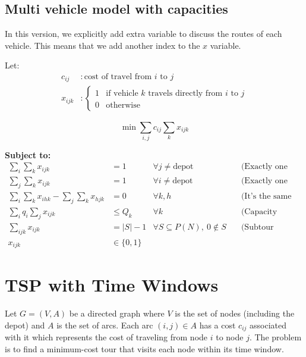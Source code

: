 \subsection{Multi vehicle model with capacities}
In this version, we explicitly add extra variable to discuss the routes of each vehicle.   This means that we add another index to the $x$ variable.

Let:
\begin{align*}
c_{ij} & : \text{cost of travel from } i \text{ to } j \\
x_{ijk} & : 
\begin{cases} 
1 & \text{if vehicle } k \text{ travels directly from } i \text{ to } j \\
0 & \text{otherwise}
\end{cases}
\end{align*}

\begin{equation}
\min \sum_{i,j} c_{ij} \sum_k x_{ijk}
\end{equation}

\textbf{Subject to:}
\begin{align*}
\sum_{i} \sum_{k} x_{ijk} &= 1 & \forall j \neq \text{depot} & \quad \text{(Exactly one vehicle in)} \\
\sum_{j} \sum_{k} x_{ijk} &= 1 & \forall i \neq \text{depot} & \quad \text{(Exactly one vehicle out)} \\
\sum_{i} \sum_{k} x_{ihk} - \sum_{j} \sum_{k} x_{hjk} &= 0 & \forall k, h & \quad \text{(It's the same vehicle)} \\
\sum_{i} q_i \sum_{j} x_{ijk} &\leq Q_k & \forall k & \quad \text{(Capacity constraint)} \\
\sum_{ijk} x_{ijk} &= |S| - 1 & \forall S \subseteq P(N), \ 0 \notin S & \quad \text{(Subtour elimination)} \\
x_{ijk} &\in \{0,1\}
\end{align*}

\section{TSP with Time Windows}
Let $G = (V, A)$ be a directed graph where $V$ is the set of nodes (including the depot) and $A$ is the set of arcs. Each arc $(i,j) \in A$ has a cost $c_{ij}$ associated with it which represents the cost of traveling from node $i$ to node $j$. The problem is to find a minimum-cost tour that visits each node within its time window.

